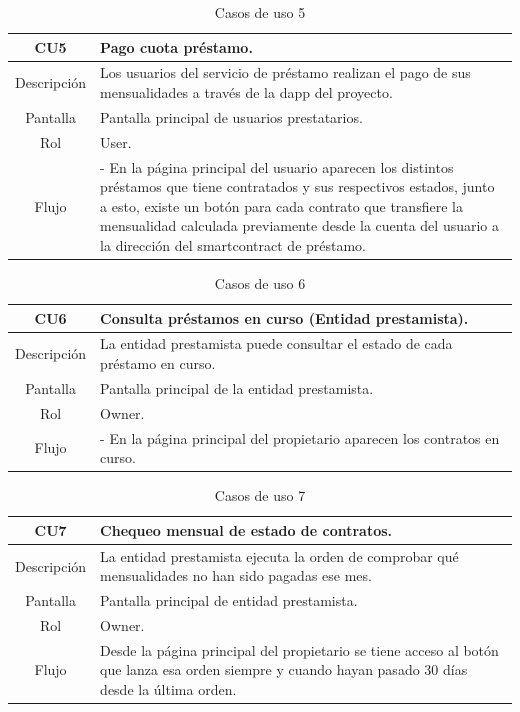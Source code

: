 \begin{table}[H]
    \centering
    \caption{Casos de uso 5}
\begin{tabular}{|c|p{12cm}|}
    \hline
    \rowcolor[HTML]{D0E7FF}
    CU5 & Pago cuota préstamo. \\ \hline
    Descripción   & Los usuarios del servicio de préstamo realizan el pago de sus 
    mensualidades a través de la \gls{dapp} del proyecto.  \\ \hline
    Pantalla     & Pantalla principal de usuarios prestatarios.   \\ \hline
    Rol     & User. \\ \hline
    Flujo     &    - En la página principal del usuario aparecen los distintos préstamos que
tiene contratados y sus respectivos estados, junto a esto, existe un botón para
cada contrato que transfiere la mensualidad calculada previamente desde la
cuenta del usuario a la dirección del \gls{smartcontract} de préstamo.
                 \\ \hline
\end{tabular}
\end{table}

\begin{table}[H]
\centering
\caption{Casos de uso 6}
\begin{tabular}{|c|p{12cm}|}
    \hline
    \rowcolor[HTML]{D0E7FF}
    CU6 & Consulta préstamos en curso (Entidad prestamista). \\ \hline
    Descripción   & La entidad prestamista puede consultar el estado de cada préstamo en
curso. \\ \hline
    Pantalla     &Pantalla principal de la entidad prestamista.  \\ \hline
    Rol     & Owner. \\ \hline
    Flujo     &    - En la página principal del propietario aparecen los contratos en curso.
                 \\ \hline
\end{tabular}
\end{table}

\begin{table}[H]
\centering
\caption{Casos de uso 7}
\begin{tabular}{|c|p{12cm}|}
    \hline
    \rowcolor[HTML]{D0E7FF}
    CU7 & Chequeo mensual de estado de contratos. \\ \hline
    Descripción   & La entidad prestamista ejecuta la orden de comprobar qué mensualidades no
han sido pagadas ese mes.  \\ \hline
    Pantalla     & Pantalla principal de entidad prestamista. \\ \hline
    Rol     & Owner. \\ \hline
    Flujo     &    Desde la página principal del propietario se tiene acceso al botón que lanza
esa orden siempre y cuando hayan pasado 30 días desde la última orden.
                 \\ \hline
\end{tabular}
\end{table}

